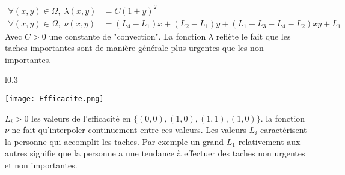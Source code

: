 \documentclass[french]{article}
\begin{document}
    \begin{align}
        \forall(x,y)\in\Omega, \; \lambda(x,y) &= C(1+y)^2 \\
        \forall(x,y)\in\Omega, \; \nu(x,y) &= (L_4-L_1)x+(L_2-L_1)y+(L_1+L_3-L_4-L_2)xy+L_1
    \end{align}
    Avec $C > 0$ une constante de "convection". La fonction $\lambda$ reflète le fait que les taches importantes sont de manière générale plus urgentes que les non importantes. 
    \clearpage
    \begin{wrapfigure}{l}{0.3\textwidth}
        \begin{center}
            \texttt{[image: Efficacite.png]}
        \end{center}
    \end{wrapfigure}
    $L_i > 0$ les valeurs de l'efficacité en $\{(0,0),(1,0),(1,1),(1,0)\}$. la fonction $\nu$ ne fait qu'interpoler continuement entre ces valeurs. Les valeurs $L_i$ caractérisent la personne qui accomplit les taches. Par exemple un grand $L_1$ relativement aux autres signifie que  la personne a une tendance à effectuer des taches non urgentes et non importantes.
    
    
\end{document}
